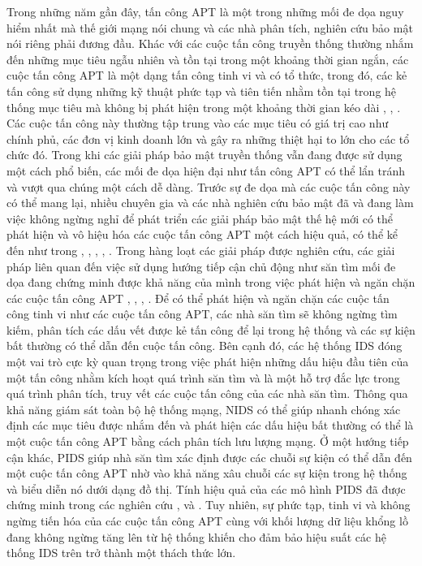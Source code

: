 Trong những năm gần đây, tấn công APT là một trong những mối đe dọa nguy hiểm nhất mà thế giới mạng nói chung và các nhà phân tích, nghiên cứu bảo mật nói riêng phải đương đầu. Khác với các cuộc tấn công truyền thống thường nhắm đến những mục tiêu ngẫu nhiên và tồn tại trong một khoảng thời gian ngắn, các cuộc tấn công APT là một dạng tấn công tinh vi và có tổ thức, trong đó, các kẻ tấn công sử dụng những kỹ thuật phức tạp và tiên tiến nhằm tồn tại trong hệ thống mục tiêu mà không bị phát hiện trong một khoảng thời gian kéo dài \cite{Alshamrani2019_apt_sur}, \cite{stojanovic2020apt_review}, \cite{ahmad2019strategically_apt}. Các cuộc tấn công này thường tập trung vào các mục tiêu có giá trị cao như chính phủ, các đơn vị kinh doanh lớn và gây ra những thiệt hại to lớn cho các tổ chức đó. Trong khi các giải pháp bảo mật truyền thống vẫn đang được sử dụng một cách phổ biến, các mối đe dọa hiện đại như tấn công APT có thể lẩn tránh và vượt qua chúng một cách dễ dàng. Trước sự đe dọa mà các cuộc tấn công này có thể mang lại, nhiều chuyên gia và các nhà nghiên cứu bảo mật đã và đang làm việc không ngừng nghỉ để phát triển các giải pháp bảo mật thế hệ mới có thể phát hiện và vô hiệu hóa các cuộc tấn công APT một cách hiệu quả, có thể kể đến như trong \cite{talib2022apt_beacon_review}, \cite{do2021novel_apt_DL}, \cite{coulter2022domain_apt_detection}, \cite{Xiong2022_Conan_apt_Detection}, \cite{ajmal2021offensive}.
\bigbreak\noindent
Trong hàng loạt các giải pháp được nghiên cứu, các giải pháp liên quan đến việc sử dụng hướng tiếp cận chủ động như săn tìm mối đe dọa đang chứng minh được khả năng của mình trong việc phát hiện và ngăn chặn các cuộc tấn công APT \cite{ajmal2021offensive}, \cite{archibald2019refining}, \cite{gunter2018practical}, \cite{gao2021enabling}. Để có thể phát hiện và ngăn chặn các cuộc tấn công tinh vi như các cuộc tấn công APT, các nhà săn tìm sẽ không ngừng tìm kiếm, phân tích các dấu vết được kẻ tấn công để lại trong hệ thống và các sự kiện bất thường có thể dẫn đến cuộc tấn công. Bên cạnh đó, các hệ thống IDS đóng một vai trò cực kỳ quan trọng trong việc phát hiện những dấu hiệu đầu tiên của một tấn công nhằm kích hoạt quá trình săn tìm và là một hỗ trợ đắc lực trong quá trình phân tích, truy vết các cuộc tấn công của các nhà săn tìm. Thông qua khả năng giám sát toàn bộ hệ thống mạng, NIDS có thể giúp nhanh chóng xác định các mục tiêu được nhắm đến và phát hiện các dấu hiệu bất thường có thể là một cuộc tấn công APT bằng cách phân tích lưu lượng mạng. Ở một hướng tiếp cận khác, PIDS giúp nhà săn tìm xác định được các chuỗi sự kiện có thể dẫn đến một cuộc tấn công APT nhờ vào khả năng xâu chuỗi các sự kiện trong hệ thống và biểu diễn nó dưới dạng đồ thị. Tính hiệu quả của các mô hình PIDS đã được chứng minh trong các nghiên cứu \cite{9900181}, \cite{gehani2021digging} và \cite{kurniawan2022krystal}. Tuy nhiên, sự phức tạp, tinh vi và không ngừng tiến hóa của các cuộc tấn công APT cùng với khối lượng dữ liệu khổng lồ đang không ngừng tăng lên từ hệ thống khiến cho đảm bảo hiệu suất các hệ thống IDS trên trở thành một thách thức lớn.
